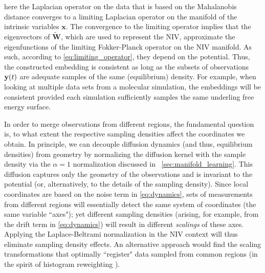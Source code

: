 here the Laplacian operator on the data that is based on the Mahalanobis distance converges to a limiting Laplacian operator on the
manifold of the intrinsic variables $\mathbf{x}$.
%
The convergence to the limiting operator implies that the eigenvectors of $\tilde{\mathbf{W}}$, which are used to represent the NIV, approximate the eigenfunctions of the limiting Fokker-Planck operator on the NIV manifold.
%
As such, according to \eqref{eq:limiting_operator}, they depend on the potential.
%
Thus, the constructed embedding is consistent as long as the subsets of observations $\mathbf{y}(t)$ are
adequate samples of the same (equilibrium) density.
%
For example, when looking at multiple data sets from a molecular simulation, the embeddings will be consistent provided each simulation sufficiently samples the same underling free energy surface.

In order to merge observations from different regions,
the fundamental question is, to what extent the respective sampling densities affect the coordinates we obtain.
%
In principle, we can decouple diffusion dynamics (and thus, equilibrium densities)
from geometry by normalizing the diffusion kernel with the sample density via the $\alpha=1$ normalization discussed in \sec~\ref{sec:manifold_learning}.
%
%
%
This diffusion captures only the geometry of the observations and is invariant to the potential (or, alternatively,
to the details of the sampling density).
%
Since local coordinates are based on the noise term in \eqref{eq:dynamics}, sets of measurements from different regions
will essentially detect the same system of coordinates (the same variable ``axes");
yet different sampling densities (arising, for example,
from the drift term in \eqref{eq:dynamics}) will result in different {\em scalings} of these axes.
%
Applying the Laplace-Beltrami normalization in the NIV context will thus eliminate sampling density effects.
%
An alternative approach would find the scaling transformations that optimally ``register"
data sampled from common regions (in the spirit of histogram reweighting \cite{ferrenberg1988new}).

